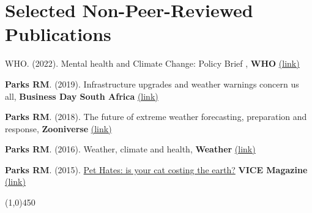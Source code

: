 \section*{Selected Non-Peer-Reviewed Publications}

\noindent WHO. (2022). Mental health and Climate Change: Policy Brief
, \textbf{WHO} \href{https://www.who.int/publications/i/item/9789240045125}{(link)} \medskip

\noindent \textbf{Parks RM}. (2019). Infrastructure upgrades and weather warnings concern us all, \textbf{Business Day South Africa} \href{https://bit.ly/2pyB4Gc}{(link)} \medskip

\noindent \textbf{Parks RM}. (2018). The future of extreme weather forecasting, preparation and response, \textbf{Zooniverse} \href{https://bit.ly/2zfDlHw}{(link)} \medskip

\noindent \textbf{Parks RM}. (2016). Weather, climate and health, \textbf{Weather} \href{https://doi.org/10.1002/wea.2752}{(link)} \medskip

\noindent \textbf{Parks RM}. (2015). \href{https://bit.ly/2FE08nX}{Pet Hates: is your cat costing the earth?} \textbf{VICE Magazine} \href{https://bit.ly/2FE08nX}{(link)}

\begin{center} \line(1,0){450} \end{center}